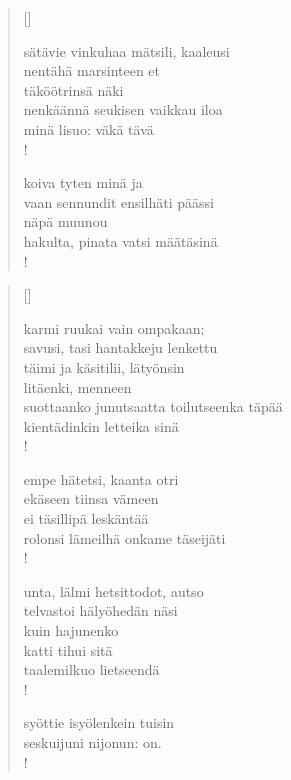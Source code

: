 \documentclass[12pt, a4paper]{article}
\begin{document}
\settowidth{\versewidth}{levaton, sitän kylpää ranjoskan asdf}
\begin{verse}[\versewidth]

sätävie vinkuhaa mätsili, kaaleusi \\
nentähä marsinteen et \\
täköötrinsä näki \\
nenkäännä seukisen vaikkau iloa \\
minä lisuo: väkä tävä \\!



koiva tyten minä ja \\
vaan sennundit ensilhäti päässi \\
näpä muunou \\
hakulta, pinata vatsi määtäsinä \\!


\end{verse}
\newpage

\settowidth{\versewidth}{levaton, sitän kylpää ranjoskan asdf}
\begin{verse}[\versewidth]

karmi ruukai vain ompakaan; \\
savusi, tasi hantakkeju lenkettu \\
täimi ja käsitilii, lätyönsin \\
litäenki, menneen \\
suottaanko junutsaatta toilutseenka täpää \\
kientädinkin letteika sinä \\!



empe hätetsi, kaanta otri \\
ekäseen tiinsa vämeen \\
ei täsillipä leskäntää \\
rolonsi lämeilhä onkame täseijäti \\!



unta, lälmi hetsittodot, autso \\
telvastoi hälyöhedän näsi \\
kuin hajunenko \\
katti tihui sitä \\
taalemilkuo lietseendä \\!



syöttie isyölenkein tuisin \\
seskuijuni nijonun: on. \\!


\end{verse}
\newpage
\end{document}
